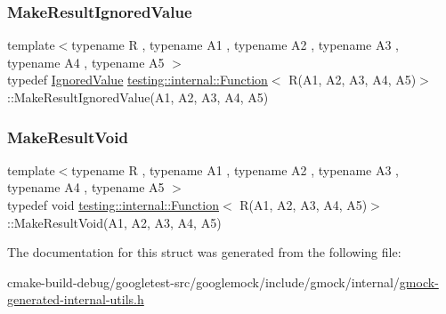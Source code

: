 \mbox{\label{structtesting_1_1internal_1_1Function_3_01R_07A1_00_01A2_00_01A3_00_01A4_00_01A5_08_4_a552ce4ec27e2d09fa1c133c66f72d7b3}} 
\subsubsection{\texorpdfstring{MakeResultIgnoredValue}{MakeResultIgnoredValue}}
{\footnotesize\ttfamily template$<$typename R , typename A1 , typename A2 , typename A3 , typename A4 , typename A5 $>$ \\
typedef \mbox{\hyperlink{classtesting_1_1internal_1_1IgnoredValue}{Ignored\+Value}} \mbox{\hyperlink{structtesting_1_1internal_1_1Function}{testing\+::internal\+::\+Function}}$<$ R(A1, A2, A3, A4, A5)$>$\+::Make\+Result\+Ignored\+Value(A1, A2, A3, A4, A5)}

\mbox{\label{structtesting_1_1internal_1_1Function_3_01R_07A1_00_01A2_00_01A3_00_01A4_00_01A5_08_4_a2903acde18de33d756eef4d43d843c04}} 
\subsubsection{\texorpdfstring{MakeResultVoid}{MakeResultVoid}}
{\footnotesize\ttfamily template$<$typename R , typename A1 , typename A2 , typename A3 , typename A4 , typename A5 $>$ \\
typedef void \mbox{\hyperlink{structtesting_1_1internal_1_1Function}{testing\+::internal\+::\+Function}}$<$ R(A1, A2, A3, A4, A5)$>$\+::Make\+Result\+Void(A1, A2, A3, A4, A5)}



The documentation for this struct was generated from the following file\+:\begin{DoxyCompactItemize}
\item 
cmake-\/build-\/debug/googletest-\/src/googlemock/include/gmock/internal/\mbox{\hyperlink{gmock-generated-internal-utils_8h}{gmock-\/generated-\/internal-\/utils.\+h}}\end{DoxyCompactItemize}
